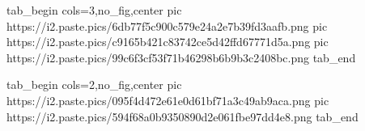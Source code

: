  
 
 
 
 
\qqSecCmtScr

\ifcmt
  tab_begin cols=3,no_fig,center
     pic https://i2.paste.pics/6db77f5c900c579e24a2e7b39fd3aafb.png
     pic https://i2.paste.pics/c9165b421c83742ce5d42ffd67771d5a.png
     pic https://i2.paste.pics/99c6f3cf53f71b46298b6b9b3c2408bc.png
  tab_end
\fi

\ifcmt
  tab_begin cols=2,no_fig,center
    pic https://i2.paste.pics/095f4d472e61e0d61bf71a3c49ab9aca.png
    pic https://i2.paste.pics/594f68a0b9350890d2e061fbe97dd4e8.png
  tab_end
\fi
